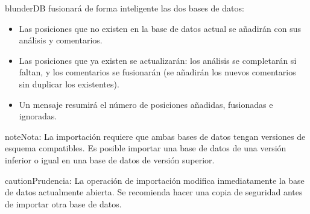 \documentclass[letterpaper,10pt,spanish]{sphinxmanual}
\begin{document}
\sphinxAtStartPar
blunderDB fusionará de forma inteligente las dos bases de datos:
\begin{itemize}
\item {} 
\sphinxAtStartPar
Las posiciones que no existen en la base de datos actual se añadirán con sus análisis y comentarios.

\item {} 
\sphinxAtStartPar
Las posiciones que ya existen se actualizarán: los análisis se completarán si faltan, y los comentarios se fusionarán (se añadirán los nuevos comentarios sin duplicar los existentes).

\item {} 
\sphinxAtStartPar
Un mensaje resumirá el número de posiciones añadidas, fusionadas e ignoradas.

\end{itemize}

\begin{sphinxadmonition}{note}{Nota:}
\sphinxAtStartPar
La importación requiere que ambas bases de datos tengan versiones de esquema compatibles. Es posible importar una base de datos de una versión inferior o igual en una base de datos de versión superior.
\end{sphinxadmonition}

\begin{sphinxadmonition}{caution}{Prudencia:}
\sphinxAtStartPar
La operación de importación modifica inmediatamente la base de datos actualmente abierta. Se recomienda hacer una copia de seguridad antes de importar otra base de datos.
\end{sphinxadmonition}
\end{document}
